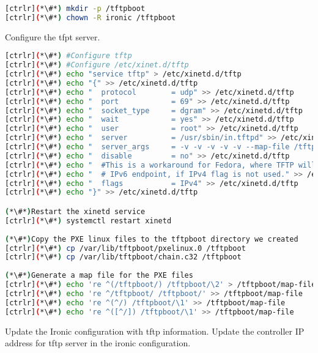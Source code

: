 
\begin{lstlisting}[language=bash,keywords={}]
[ctrlr](*\#*) mkdir -p /tftpboot
[ctrlr](*\#*) chown -R ironic /tftpboot
\end{lstlisting} 

Configure the tfpt server.


\begin{lstlisting}[language=bash,keywords={}]
[ctrlr](*\#*) #Configure tftp 
[ctrlr](*\#*) #Configure /etc/xinet.d/tftp
[ctrlr](*\#*) echo "service tftp" > /etc/xinetd.d/tftp
[ctrlr](*\#*) echo "{" >> /etc/xinetd.d/tftp
[ctrlr](*\#*) echo "  protocol        = udp" >> /etc/xinetd.d/tftp
[ctrlr](*\#*) echo "  port            = 69" >> /etc/xinetd.d/tftp
[ctrlr](*\#*) echo "  socket_type     = dgram" >> /etc/xinetd.d/tftp
[ctrlr](*\#*) echo "  wait            = yes" >> /etc/xinetd.d/tftp
[ctrlr](*\#*) echo "  user            = root" >> /etc/xinetd.d/tftp
[ctrlr](*\#*) echo "  server          = /usr/sbin/in.tftpd" >> /etc/xinetd.d/tftp
[ctrlr](*\#*) echo "  server_args     = -v -v -v -v -v --map-file /tftpboot/map-file /tftpboot" >> /etc/xinetd.d/tftp
[ctrlr](*\#*) echo "  disable         = no" >> /etc/xinetd.d/tftp
[ctrlr](*\#*) echo "  #This is a workaround for Fedora, where TFTP will listen only on" >> /etc/xinetd.d/tftp
[ctrlr](*\#*) echo "  # IPv6 endpoint, if IPv4 flag is not used." >> /etc/xinetd.d/tftp
[ctrlr](*\#*) echo "  flags           = IPv4" >> /etc/xinetd.d/tftp
[ctrlr](*\#*) echo "}" >> /etc/xinetd.d/tftp

(*\#*)Restart the xinetd service
[ctrlr](*\#*) systemctl restart xinetd
    
(*\#*)Copy the PXE linux files to the tftpboot directory we created
[ctrlr](*\#*) cp /var/lib/tftpboot/pxelinux.0 /tftpboot
[ctrlr](*\#*) cp /var/lib/tftpboot/chain.c32 /tftpboot
    
(*\#*)Generate a map file for the PXE files
[ctrlr](*\#*) echo 're ^(/tftpboot/) /tftpboot/\2' > /tftpboot/map-file
[ctrlr](*\#*) echo 're ^/tftpboot/ /tftpboot/' >> /tftpboot/map-file
[ctrlr](*\#*) echo 're ^(^/) /tftpboot/\1' >> /tftpboot/map-file
[ctrlr](*\#*) echo 're ^([^/]) /tftpboot/\1' >> /tftpboot/map-file
\end{lstlisting} 


	Update the Ironic configuration with tftp information. Update the controller IP address for tftp server in the ironic configuration.

